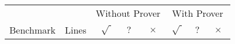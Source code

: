 \documentclass{article}
\begin{document}
\begin{tabular}{l|r|r@{~~}r@{~~}r|r@{~~}r@{~~}r}
     &       &  \multicolumn{3}{c|}{Without Prover} &
\multicolumn{3}{c}{With Prover} \\
\multicolumn{1}{c|}{Benchmark} & \multicolumn{1}{c|}{Lines} &
$\ \surd\ $ & $\ ?\ $ & $\ \times\ $ & $\ \surd\ $ &
$\ ?\ $ & $\ \times\ $ \\
\hline   

\end{tabular}
\end{document}
